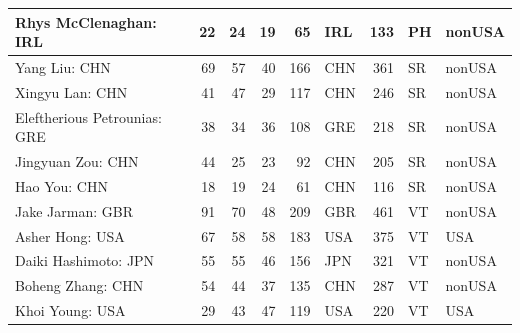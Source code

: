 \documentclass[
  10.5pt,
  letterpaper,
  DIV=11,
  numbers=noendperiod]{scrartcl}
\begin{document}
\begin{table}[H]
\begin{tabular}[t]{l|r|r|r|r|l|r|l|l}
\hline
Rhys McClenaghan: IRL & 22 & 24 & 19 & 65 & IRL & 133 & PH & nonUSA\\
\hline
Yang Liu: CHN & 69 & 57 & 40 & 166 & CHN & 361 & SR & nonUSA\\
\hline
Xingyu Lan: CHN & 41 & 47 & 29 & 117 & CHN & 246 & SR & nonUSA\\
\hline
Eleftherious Petrounias: GRE & 38 & 34 & 36 & 108 & GRE & 218 & SR & nonUSA\\
\hline
Jingyuan Zou: CHN & 44 & 25 & 23 & 92 & CHN & 205 & SR & nonUSA\\
\hline
Hao You: CHN & 18 & 19 & 24 & 61 & CHN & 116 & SR & nonUSA\\
\hline
Jake Jarman: GBR & 91 & 70 & 48 & 209 & GBR & 461 & VT & nonUSA\\
\hline
Asher Hong: USA & 67 & 58 & 58 & 183 & USA & 375 & VT & USA\\
\hline
Daiki Hashimoto: JPN & 55 & 55 & 46 & 156 & JPN & 321 & VT & nonUSA\\
\hline
Boheng Zhang: CHN & 54 & 44 & 37 & 135 & CHN & 287 & VT & nonUSA\\
\hline
Khoi Young: USA & 29 & 43 & 47 & 119 & USA & 220 & VT & USA\\
\hline
\end{tabular}
\end{table}
\end{document}
